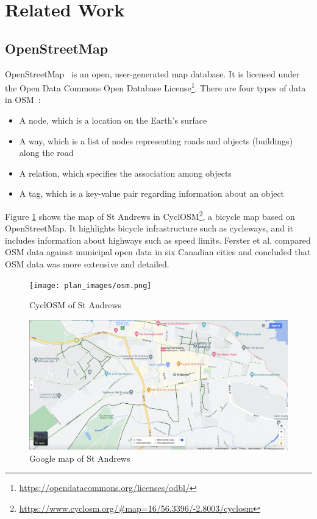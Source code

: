 \documentclass[12pt,a4paper]{report}
\begin{document}

\section*{Related Work}
\subsection*{OpenStreetMap}
OpenStreetMap~\cite{OpenStreetMap} is an open, user-generated map database. It is licensed under the Open Data Commons Open Database License\footnote{\url{https://opendatacommons.org/licenses/odbl/}}. There are four types of data in OSM~\cite{9119753}:
\begin{itemize}
    \item A node, which is a location on the Earth's surface
    \item A way, which is a list of nodes representing roads and objects (buildings) along the road
    \item A relation, which specifies the association among objects
    \item A tag, which is a key-value pair regarding information about an object
\end{itemize}

Figure \ref{fig:osm_sta} shows the map of St Andrews in CyclOSM\footnote{\url{https://www.cyclosm.org/#map=16/56.3396/-2.8003/cyclosm}}, a bicycle map based on OpenStreetMap. It highlights bicycle infrastructure such as cycleways, and it includes information about highways such as speed limits. Ferster et al. \cite{doi:10.1080/15568318.2018.1519746} compared OSM data against municipal open data in six Canadian cities and concluded that OSM data was more extensive and detailed.

\begin{figure}[ht!]
\centering
\texttt{[image: plan\_images/osm.png]}
\caption{CyclOSM of St Andrews}
\label{fig:osm_sta}
\end{figure}

\begin{figure}[ht!]
\centering
\includegraphics[width=1\textwidth]{plan_images/googlemap.png}
\caption{Google map of St Andrews}
\label{fig:google_sta}
\end{figure}
\end{document}
